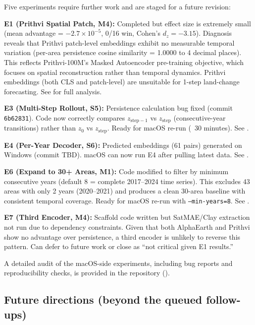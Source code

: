 \documentclass{article}
\begin{document}
Five experiments require further work and are staged for a future revision:

\textbf{E1 (Prithvi Spatial Patch, M4):} Completed but effect size is extremely small (mean advantage = $-2.7\times 10^{-5}$, 0/16 win, Cohen's $d_z = -3.15$). Diagnosis reveals that Prithvi patch-level embeddings exhibit no measurable temporal variation (per-area persistence cosine similarity = 1.0000 to 4 decimal places). This reflects Prithvi-100M's Masked Autoencoder pre-training objective, which focuses on spatial reconstruction rather than temporal dynamics. Prithvi embeddings (both CLS and patch-level) are unsuitable for 1-step land-change forecasting. See  for full analysis.

\textbf{E3 (Multi-Step Rollout, S5):} Persistence calculation bug fixed (commit \texttt{6b62831}). Code now correctly compares $z_{\text{step}-1}$ vs $z_{\text{step}}$ (consecutive-year transitions) rather than $z_0$ vs $z_{\text{step}}$. Ready for macOS re-run (~30 minutes). See .

\textbf{E4 (Per-Year Decoder, S6):} Predicted embeddings (61 pairs) generated on Windows (commit TBD). macOS can now run E4 after pulling latest data. See .

\textbf{E6 (Expand to 30+ Areas, M1):} Code modified to filter by minimum consecutive years (default 8 = complete 2017--2024 time series). This excludes 43 areas with only 2 years (2020--2021) and produces a clean 30-area baseline with consistent temporal coverage. Ready for macOS re-run with \texttt{--min-years=8}. See .

\textbf{E7 (Third Encoder, M4):} Scaffold code written but SatMAE/Clay extraction not run due to dependency constraints. Given that both AlphaEarth and Prithvi show no advantage over persistence, a third encoder is unlikely to reverse this pattern. Can defer to future work or close as ``not critical given E1 results.''

A detailed audit of the macOS-side experiments, including bug reports and reproducibility checks, is provided in the repository ().

\subsection{Future directions (beyond the queued follow-ups)}
\label{sec:future}
\end{document}
